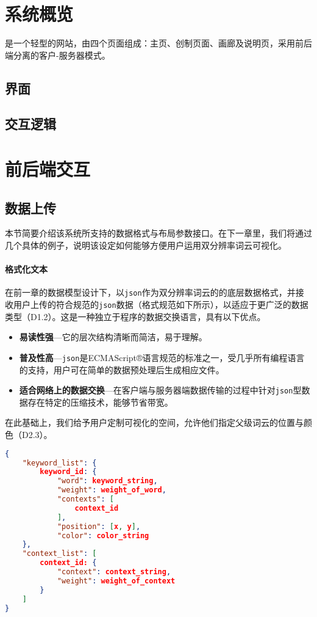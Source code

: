 \section{系统概览}
\toolname{}是一个轻型的网站，由四个页面组成：主页、创制页面、画廊及说明页，采用前后端分离的客户-服务器模式。

\subsection{界面}
\subsection{交互逻辑}



\section{前后端交互}
\subsection{数据上传}
本节简要介绍该系统所支持的数据格式与布局参数接口。在下一章里，我们将通过几个具体的例子，说明该设定如何能够方便用户运用双分辨率词云可视化。
\paragraph	{\textbf{格式化文本}}
在前一章的数据模型设计下，\toolname{}以\texttt{json}作为双分辨率词云的的底层数据格式，并接收用户上传的符合规范的\texttt{json}数据（格式规范如下所示），以适应于更广泛的数据类型（D1.2）。这是一种独立于程序的数据交换语言，具有以下优点。
\begin{itemize}
	\item \textbf{易读性强}---它的层次结构清晰而简洁，易于理解。
	\item \textbf{普及性高}---\texttt{json}是ECMAScript®语言规范的标准之一，受几乎所有编程语言的支持，用户可在简单的数据预处理后生成相应文件。
	\item \textbf{适合网络上的数据交换}---在客户端与服务器端数据传输的过程中针对\texttt{json}型数据存在特定的压缩技术，能够节省带宽。
\end{itemize}

在此基础上，我们给予用户定制可视化的空间，允许他们指定父级词云的位置与颜色（D2.3）。

\begin{lstlisting}[language=json, caption=\texttt{json}上传数据格式规范，父级词云的位置与颜色域可为空]
{
	"keyword_list": {
		keyword_id: {
			"word": keyword_string,
			"weight": weight_of_word,
			"contexts": [
				context_id
			],
			"position": [x, y],
			"color": color_string
	},
	"context_list": [
		context_id: {
			"context": context_string,
			"weight": weight_of_context
		}
	]
}
\end{lstlisting}

